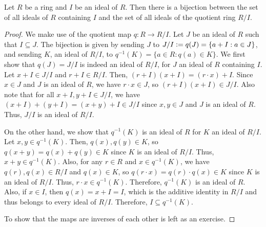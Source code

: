 \begin{proposition}
    Let $R$ be a ring and $I$ be an ideal of $R$. Then there is a bijection between the set of all ideals of $R$ containing $I$ and the set of all ideals of the quotient ring $R/I$.
\end{proposition}
\begin{proof}
    We make use of the quotient map $q:R \to R/I$. Let $J$ be an ideal of $R$ such that $I \subseteq J$. The bijection is given by sending $J$ to $J/I \vcentcolon= q(J) = \{a + I : a \in J\}$, and sending $K$, an ideal of $R/I$, to $q^{-1}(K) = \{a \in R : q(a) \in K\}$. We first show that $q(J) = J/I$ is indeed an ideal of $R/I$, for $J$ an ideal of $R$ containing $I$. Let $x+I \in J/I$ and $r + I \in R/I$. Then, $(r+I)(x+I) = (r \cdot x) + I$. Since $x \in J$ and $J$ is an ideal of $R$, we have $r \cdot x \in J$, so $(r + I)(x + I) \in J/I$. Also note that for all $x + I, y + I \in J/I$, we have $(x + I) + (y + I) = (x + y) + I \in J/I$ since $x, y \in J$ and $J$ is an ideal of $R$. Thus, $J/I$ is an ideal of $R/I$.

    On the other hand, we show that $q^{-1}(K)$ is an ideal of $R$ for $K$ an ideal of $R/I$. Let $x,y \in q^{-1}(K)$. Then, $q(x), q(y) \in K$, so $q(x+y) = q(x) + q(y) \in K$ since $K$ is an ideal of $R/I$. Thus, $x + y \in q^{-1}(K)$. Also, for any $r \in R$ and $x \in q^{-1}(K)$, we have $q(r), q(x) \in R/I$ and $q(x) \in K$, so $q(r \cdot x) = q(r) \cdot q(x) \in K$ since $K$ is an ideal of $R/I$. Thus, $r \cdot x \in q^{-1}(K)$. Therefore, $q^{-1}(K)$ is an ideal of $R$. Also, if $x \in I$, then $q(x) = x + I = I$, which is the additive identity in $R/I$ and thus belongs to every ideal of $R/I$. Therefore, $I \subseteq q^{-1}(K)$.

    To show that the maps are inverses of each other is left as an exercise.
\end{proof}

